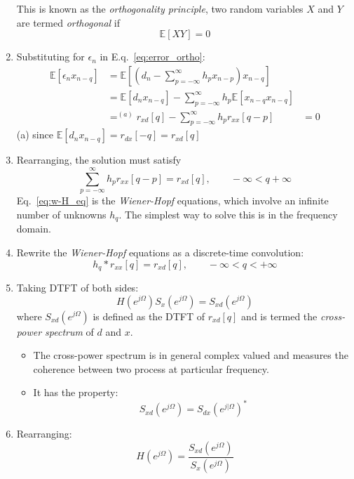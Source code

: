 \documentclass[12pt]{article}
\newcommand{\titc}[1]{\textit{\textcolor{blue1}{#1}}}
\newcommand{\mexp}{\mathbb{E}}
\newcommand{\summ}[2]{\sum_{#1}^{#2}}
\newcommand{\sumpinfinf}{\summ{p=-\infty}{\infty}}
\newcommand{\autocox}{r_{xx}}
\newcommand{\des}{d_n}
\newcommand{\err}{\epsilon_n}
\begin{document}
\begin{enumerate}
    This is known as the \titc{orthogonality principle}, two random variables $X$ and $Y$ are termed \titc{orthogonal} if 
    \[
    \mexp[XY] = 0
    \]
    \item Substituting for $\err$ in E.q.~\ref{eq:error_ortho}:
    \begin{align*}
        \mexp[\err x_{n-q}] &= \mexp\left[ \left( d_n - \sumpinfinf h_p x_{n-p}\right)x_{n-q}\right] \\
        & = \mexp[\des x_{n-q}] - \sumpinfinf h_p \mexp[x_{n-q}x_{n-q}] \\
        & =^{(a)} r_{xd}[q] - \sumpinfinf h_p \autocox[q-p]
        & = 0
    \end{align*}
    (a) since $\mexp[\des x_{n-q}] = r_{dx}[-q] = r_{xd}[q]$
    \item Rearranging, the solution must satisfy
    \begin{equation}
        \sumpinfinf h_p \autocox[q-p] = r_{xd}[q], \qquad -\infty < q +\infty 
        \label{eq:w-H_eq}
    \end{equation}
    Eq.~\ref{eq:w-H_eq} is the \titc{Wiener-Hopf} equations, which involve an infinite number of unknowns $h_q$. The simplest way to solve this is in the frequency domain. 
    \item Rewrite the \titc{Wiener-Hopf} equations as a discrete-time convolution:
    \[
    h_q * \autocox[q] = r_{xd}[q], \qquad -\infty < q < +\infty
    \]
    \item Taking DTFT of both sides:
    \[
    H(e^{j\Omega})S_x(e^{j\Omega}) =S_{xd}(e^{j\Omega})
    \]
    where \textcolor{blue1}{$S_{xd}(e^{j\Omega})$} is defined as the DTFT of \textcolor{blue1}{$r_{xd}[q]$} and is termed the \titc{cross-power spectrum} of $d$ and $x$.
    \begin{itemize}
        \item The cross-power spectrum is in general complex valued and measures the coherence between two process at particular frequency. 
        \item It has the property:
        \[
        S_{xd}(e^{j\Omega}) = S_{dx}(e^{j|\Omega})^*
        \]
    \end{itemize}
    \item Rearranging:
    \begin{equation}
        H(e^{j\Omega}) = \frac{S_{xd}(e^{j\Omega})}{S_x(e^{j\Omega})}
        \label{eq:optimal_filter}
    \end{equation}
    
\end{enumerate}
\end{document}
